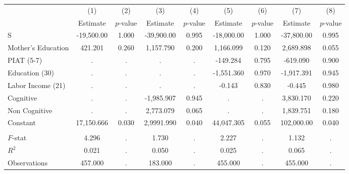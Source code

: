 \begin{tabular}{lcccccccc} \toprule
 & (1) & (2) & (3) & (4) & (5) & (6) & (7) & (8) \\ 
 & Estimate  & $p$-value  & Estimate  & $p$-value  & Estimate  & $p$-value  & Estimate  & $p$-value  \\  \midrule
S & -19,500.00 &     1.000 & -39,900.00 &     0.995 & -18,000.00 &     1.000 & -37,800.00 &     0.995 \\  
Mother's Education &   421.201 &     0.260 &  1,157.790 &     0.200 &  1,166.099 &     0.120 &  2,689.898 &     0.055 \\  
PIAT (5-7) &         . &         . &         . &         . &  -149.284 &     0.795 &  -619.090 &     0.900 \\  
Education (30) &         . &         . &         . &         . & -1,551.360 &     0.970 & -1,917.391 &     0.945 \\  
Labor Income (21) &         . &         . &         . &         . &    -0.143 &     0.830 &    -0.445 &     0.980 \\  
Cognitive &         . &         . & -1,985.907 &     0.945 &         . &         . &  3,830.170 &     0.220 \\  
Non Cognitive &         . &         . &  2,773.079 &     0.065 &         . &         . &  1,839.751 &     0.180 \\  
Constant & 17,150.666 &     0.030 & 2,9991.990 &     0.040 & 44,047.305 &     0.055 &  102,000.00 &     0.040 \\  \\ \midrule
$F$-stat &     4.296 &         . &     1.730 &         . &     2.227 &         . &     1.132 &         . \\  
$R^2$ &     0.021 &         . &     0.050 &         . &     0.025 &         . &     0.065 &         . \\  
Observations &   457.000 &         . &   183.000 &         . &   455.000 &         . &   455.000 &         . \\  
\bottomrule \end{tabular}
